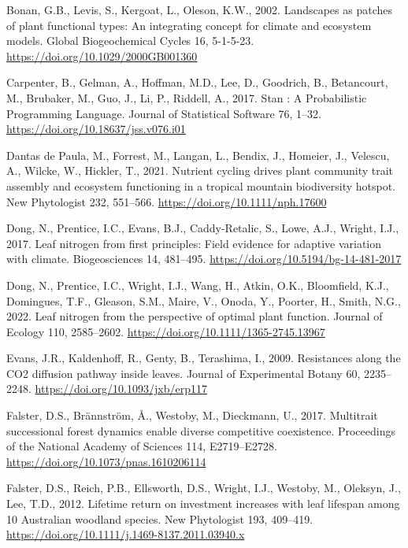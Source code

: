 \documentclass[
  12pt,
  letterpaper,
  DIV=11,
  numbers=noendperiod]{scrartcl}
\newlength{\cslhangindent}
\newenvironment{CSLReferences}[2] %
 {\begin{list}{}{%
  \setlength{\itemindent}{0pt}
  \setlength{\leftmargin}{0pt}
  \setlength{\parsep}{0pt}
  \ifodd #1
   \setlength{\leftmargin}{\cslhangindent}
   \setlength{\itemindent}{-1\cslhangindent}
  \fi
  \setlength{\itemsep}{#2\baselineskip}}}
 {\end{list}}
\begin{document}
\label{refs}
\begin{CSLReferences}{1}{0}
Bonan, G.B., Levis, S., Kergoat, L., Oleson, K.W., 2002. Landscapes as
patches of plant functional types: {An} integrating concept for climate
and ecosystem models. Global Biogeochemical Cycles 16, 5-1-5-23.
\url{https://doi.org/10.1029/2000GB001360}

Carpenter, B., Gelman, A., Hoffman, M.D., Lee, D., Goodrich, B.,
Betancourt, M., Brubaker, M., Guo, J., Li, P., Riddell, A., 2017. Stan :
{A Probabilistic Programming Language}. Journal of Statistical Software
76, 1--32. \url{https://doi.org/10.18637/jss.v076.i01}

Dantas de Paula, M., Forrest, M., Langan, L., Bendix, J., Homeier, J.,
Velescu, A., Wilcke, W., Hickler, T., 2021. Nutrient cycling drives
plant community trait assembly and ecosystem functioning in a tropical
mountain biodiversity hotspot. New Phytologist 232, 551--566.
\url{https://doi.org/10.1111/nph.17600}

Dong, N., Prentice, I.C., Evans, B.J., Caddy-Retalic, S., Lowe, A.J.,
Wright, I.J., 2017. Leaf nitrogen from first principles: Field evidence
for adaptive variation with climate. Biogeosciences 14, 481--495.
\url{https://doi.org/10.5194/bg-14-481-2017}

Dong, N., Prentice, I.C., Wright, I.J., Wang, H., Atkin, O.K.,
Bloomfield, K.J., Domingues, T.F., Gleason, S.M., Maire, V., Onoda, Y.,
Poorter, H., Smith, N.G., 2022. Leaf nitrogen from the perspective of
optimal plant function. Journal of Ecology 110, 2585--2602.
\url{https://doi.org/10.1111/1365-2745.13967}

Evans, J.R., Kaldenhoff, R., Genty, B., Terashima, I., 2009. Resistances
along the {CO2} diffusion pathway inside leaves. Journal of Experimental
Botany 60, 2235--2248. \url{https://doi.org/10.1093/jxb/erp117}

Falster, D.S., Brännström, Å., Westoby, M., Dieckmann, U., 2017.
Multitrait successional forest dynamics enable diverse competitive
coexistence. Proceedings of the National Academy of Sciences 114,
E2719--E2728. \url{https://doi.org/10.1073/pnas.1610206114}

Falster, D.S., Reich, P.B., Ellsworth, D.S., Wright, I.J., Westoby, M.,
Oleksyn, J., Lee, T.D., 2012. Lifetime return on investment increases
with leaf lifespan among 10 {Australian} woodland species. New
Phytologist 193, 409--419.
\url{https://doi.org/10.1111/j.1469-8137.2011.03940.x}


\end{CSLReferences}
\end{document}
